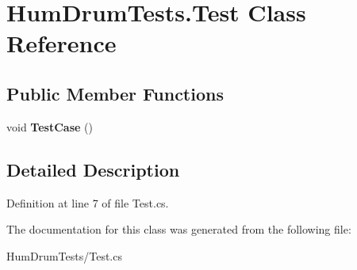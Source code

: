 \hypertarget{classHumDrumTests_1_1Test}{}\section{Hum\+Drum\+Tests.\+Test Class Reference}
\label{classHumDrumTests_1_1Test}
\subsection*{Public Member Functions}
\begin{DoxyCompactItemize}
\item 
void {\bfseries Test\+Case} ()\hypertarget{classHumDrumTests_1_1Test_a4beeda58524488aabd71179fd5dcf8f8}{}\label{classHumDrumTests_1_1Test_a4beeda58524488aabd71179fd5dcf8f8}

\end{DoxyCompactItemize}


\subsection{Detailed Description}


Definition at line 7 of file Test.\+cs.



The documentation for this class was generated from the following file\+:\begin{DoxyCompactItemize}
\item 
Hum\+Drum\+Tests/Test.\+cs\end{DoxyCompactItemize}
